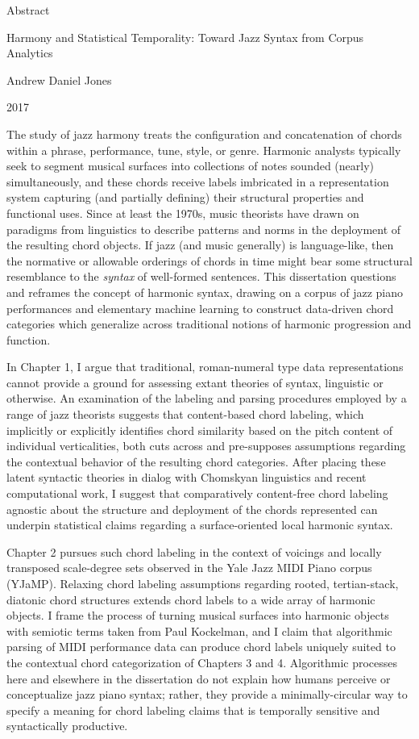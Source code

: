 \centerline{Abstract}

\centerline{Harmony and Statistical Temporality: Toward Jazz Syntax from Corpus Analytics}

\centerline{Andrew Daniel Jones}

\centerline{2017}

The study of jazz harmony treats the configuration and concatenation of chords within a phrase, performance, tune, style, or genre.  Harmonic analysts typically seek to segment musical surfaces into collections of notes sounded (nearly) simultaneously, and these chords receive labels imbricated in a representation system capturing (and partially defining) their structural properties and functional uses.  Since at least the 1970s, music theorists have drawn on paradigms from linguistics to describe patterns and norms in the deployment of the resulting chord objects.  If jazz (and music generally) is language-like, then the normative or allowable orderings of chords in time might bear some structural resemblance to the \emph{syntax} of well-formed sentences.  This dissertation questions and reframes the concept of harmonic syntax, drawing on a corpus of jazz piano performances and elementary machine learning to construct data-driven chord categories which generalize across traditional notions of harmonic progression and function.

In Chapter 1, I argue that traditional, roman-numeral type data representations cannot provide a ground for assessing extant theories of syntax, linguistic or otherwise.  An examination of the labeling and parsing procedures employed by a range of jazz theorists suggests that content-based chord labeling, which implicitly or explicitly identifies chord similarity based on the pitch content of individual verticalities, both cuts across and pre-supposes assumptions regarding the contextual behavior of the resulting chord categories.  After placing these latent syntactic theories in dialog with Chomskyan linguistics and recent computational work, I suggest that comparatively content-free chord labeling agnostic about the structure and deployment of the chords represented can underpin statistical claims regarding a surface-oriented local harmonic syntax.

Chapter 2 pursues such chord labeling in the context of voicings and locally transposed scale-degree sets observed in the Yale Jazz MIDI Piano corpus (YJaMP).  Relaxing chord labeling assumptions regarding rooted, tertian-stack, diatonic chord structures extends chord labels to a wide array of harmonic objects.  I frame the process of turning musical surfaces into harmonic objects with semiotic terms taken from Paul Kockelman, and I claim that algorithmic parsing of MIDI performance data can produce chord labels uniquely suited to the contextual chord categorization of Chapters 3 and 4.  Algorithmic processes here and elsewhere in the dissertation do not explain how humans perceive or conceptualize jazz piano syntax; rather, they provide a minimally-circular way to specify a meaning for chord labeling claims that is temporally sensitive and syntactically productive.

